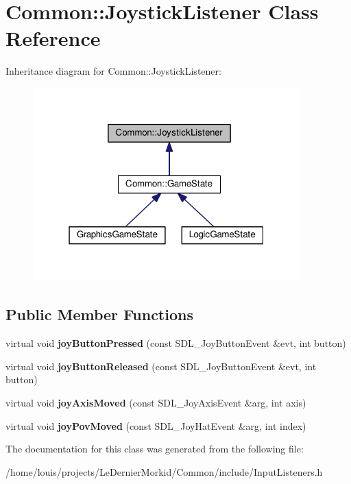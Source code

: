 \hypertarget{class_common_1_1_joystick_listener}{}\section{Common\+:\+:Joystick\+Listener Class Reference}
\label{class_common_1_1_joystick_listener}


Inheritance diagram for Common\+:\+:Joystick\+Listener\+:\nopagebreak
\begin{figure}[H]
\begin{center}
\leavevmode
\includegraphics[width=292pt]{class_common_1_1_joystick_listener__inherit__graph}
\end{center}
\end{figure}
\subsection*{Public Member Functions}
\begin{DoxyCompactItemize}
\item 
\mbox{\label{class_common_1_1_joystick_listener_a0b1d0c64903a2ac2e5c5f7f8bfb7ce81}} 
virtual void {\bfseries joy\+Button\+Pressed} (const S\+D\+L\+\_\+\+Joy\+Button\+Event \&evt, int button)
\item 
\mbox{\label{class_common_1_1_joystick_listener_a9ed8cc90e3644cdbd00355acba3cb1e5}} 
virtual void {\bfseries joy\+Button\+Released} (const S\+D\+L\+\_\+\+Joy\+Button\+Event \&evt, int button)
\item 
\mbox{\label{class_common_1_1_joystick_listener_ad8cc8de4cab46d53f99c496247ec381e}} 
virtual void {\bfseries joy\+Axis\+Moved} (const S\+D\+L\+\_\+\+Joy\+Axis\+Event \&arg, int axis)
\item 
\mbox{\label{class_common_1_1_joystick_listener_ac18be87a19beedcd9b93b38849575062}} 
virtual void {\bfseries joy\+Pov\+Moved} (const S\+D\+L\+\_\+\+Joy\+Hat\+Event \&arg, int index)
\end{DoxyCompactItemize}


The documentation for this class was generated from the following file\+:\begin{DoxyCompactItemize}
\item 
/home/louis/projects/\+Le\+Dernier\+Morkid/\+Common/include/Input\+Listeners.\+h\end{DoxyCompactItemize}
